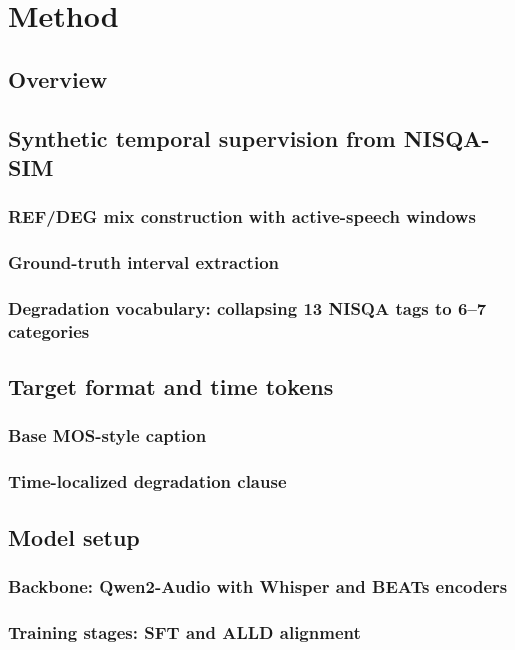 \chapter{Method} \label{ch:method}

\section{Overview} \label{sec:method-overview}

\section{Synthetic temporal supervision from NISQA-SIM} \label{sec:method-data-construction}
\subsection{REF/DEG mix construction with active-speech windows}
\subsection{Ground-truth interval extraction}
\subsection{Degradation vocabulary: collapsing 13 NISQA tags to 6--7 categories}

\section{Target format and time tokens} \label{sec:method-target-format}
\subsection{Base MOS-style caption}
\subsection{Time-localized degradation clause}

\section{Model setup} \label{sec:method-model}
\subsection{Backbone: Qwen2-Audio with Whisper and BEATs encoders}
\subsection{Training stages: SFT and ALLD alignment}
